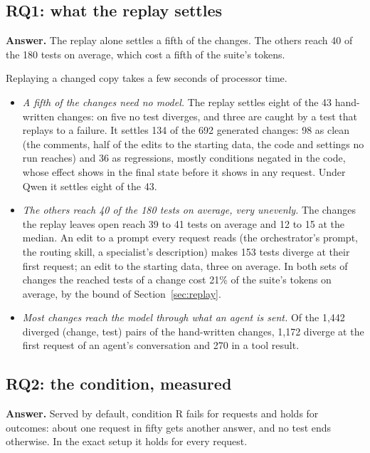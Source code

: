 \documentclass[11pt,a4paper]{article}
\newcommand{\answer}[1]{\noindent\textbf{Answer.} #1\par\smallskip}
\begin{document}
\subsection{RQ1: what the replay settles}

\answer{The replay alone settles a fifth of the changes. The others reach 40 of the 180 tests on average, which
cost a fifth of the suite's tokens.}

Replaying a changed copy takes a few seconds of processor time.
\begin{itemize}
  \item \emph{A fifth of the changes need no model.} The replay settles eight of the 43 hand-written changes: on
        five no test diverges, and three are caught by a test that replays to a failure. It settles 134 of the 692
        generated changes: 98 as clean (the comments, half of the edits to the starting data, the code and settings
        no run reaches) and 36 as regressions, mostly conditions negated in the code, whose effect shows in the
        final state before it shows in any request. Under Qwen it settles eight of the 43.
  \item \emph{The others reach 40 of the 180 tests on average, very unevenly.} The changes the replay leaves open
        reach 39 to 41 tests on average and 12 to 15 at the median. An edit to a prompt every request reads (the
        orchestrator's prompt, the routing skill, a specialist's description) makes 153 tests diverge at their
        first request; an edit to the starting data, three on average. In both sets of changes the reached tests of
        a change cost 21\% of the suite's tokens on average, by the bound of Section~\ref{sec:replay}.
  \item \emph{Most changes reach the model through what an agent is sent.} Of the 1,442 diverged (change, test)
        pairs of the hand-written changes, 1,172 diverge at the first request of an agent's conversation and 270 in
        a tool result.
\end{itemize}

\subsection{RQ2: the condition, measured}
\label{sec:rq2}

\answer{Served by default, condition R fails for requests and holds for outcomes: about one request in fifty gets
another answer, and no test ends otherwise. In the exact setup it holds for every request.}
\end{document}
